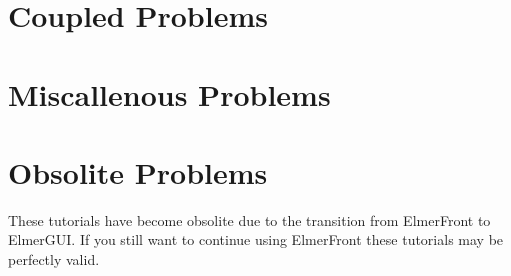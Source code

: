 \documentclass[a4paper,english]{report}    %
\begin{document}
\part{Coupled Problems}

\graphicspath{{./}{RayleighBenardGUI/}}


%

\graphicspath{{./}{InductionHeating/}}


\graphicspath{{./}{FluidStructureBeam/}}


\graphicspath{{./}{ThermalActuator/}}


\graphicspath{{./}{CoatingProcess/}}


\graphicspath{{./}{ArteryFlow/}}




\part{Miscallenous Problems}

\graphicspath{{./}{TemperatureOperatorSplitting/}}


\graphicspath{{./}{PoissonBEM/}}


\graphicspath{{./}{Temperature1D/}}


\graphicspath{{./}{FlowLinearRestriction/}}


\graphicspath{{./}{FlowStreamlines/}}


\graphicspath{{./}{Microfluidic/}}


\graphicspath{{./}{PassiveElements/}}



%

\part{Obsolite Problems}

These tutorials have become obsolite due to the transition from 
ElmerFront to ElmerGUI. If you still want to continue using ElmerFront these
tutorials may be perfectly valid.
\end{document}
